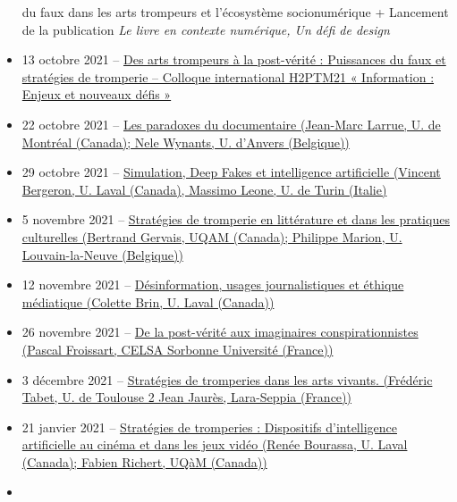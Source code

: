 \documentclass[
  a4paper,
  DIV=11,
  numbers=noendperiod]{scrreprt}
\begin{document}
\begin{itemize}
{  du faux dans les arts trompeurs et l'écosystème socionumérique +
  Lancement de la publication \emph{Le livre en contexte numérique, Un
  défi de design}}
\item
  13 octobre 2021 --
  \href{https://crilcq.arcanes.ca/event/puissance-du-faux-dans-les-arts-trompeurs-et-lecosysteme-socionumerique/}{Des
  arts trompeurs à la post-vérité : Puissances du faux et stratégies de
  tromperie -- Colloque international H2PTM21 « Information : Enjeux et
  nouveaux défis »}
\item
  22 octobre 2021 --
  \href{https://crilcq.arcanes.ca/event/frictions-de-la-fiction-les-paradoxes-du-documentaire/}{Les
  paradoxes du documentaire (Jean-Marc Larrue, U. de Montréal (Canada);
  Nele Wynants, U. d'Anvers (Belgique))}
\item
  29 octobre 2021 --
  \href{https://crilcq.arcanes.ca/event/simulation-deep-fakes-et-intelligence-artificielle/}{Simulation,
  Deep Fakes et intelligence artificielle (Vincent Bergeron, U. Laval
  (Canada), Massimo Leone, U. de Turin (Italie)}
\item
  5 novembre 2021 --
  \href{https://crilcq.arcanes.ca/event/strategies-de-tromperie-en-litterature-et-dans-les-pratiques-culturelles/}{Stratégies
  de tromperie en littérature et dans les pratiques culturelles
  (Bertrand Gervais, UQAM (Canada); Philippe Marion, U. Louvain-la-Neuve
  (Belgique))}
\item
  12 novembre 2021 --
  \href{https://crilcq.arcanes.ca/event/desinformation-usages-journalistiques-et-ethique-mediatique/}{Désinformation,
  usages journalistiques et éthique médiatique (Colette Brin, U. Laval
  (Canada))}
\item
  26 novembre 2021 --
  \href{https://crilcq.arcanes.ca/event/de-la-post-verite-aux-imaginaires-conspirationnistes/}{De
  la post-vérité aux imaginaires conspirationnistes (Pascal Froissart,
  CELSA Sorbonne Université (France))}
\item
  3 décembre 2021 --
  \href{https://crilcq.arcanes.ca/event/strategies-de-tromperies-dans-les-arts-vivants-magie/}{Stratégies
  de tromperies dans les arts vivants. (Frédéric Tabet, U. de Toulouse 2
  Jean Jaurès, Lara-Seppia (France))}
\item
  21 janvier 2021 --
  \href{https://crilcq.arcanes.ca/event/colloque-etudiants-invites-a-confirmer/}{Stratégies
  de tromperies : Dispositifs d'intelligence artificielle au cinéma et
  dans les jeux vidéo (Renée Bourassa, U. Laval (Canada); Fabien
  Richert, UQàM (Canada))}
\item

\end{itemize}
\end{document}
